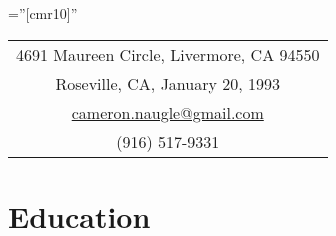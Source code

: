 \documentclass[10pt]{article} %
\newcommand{\secspace}{.25em}
\begin{document}
\thispagestyle{empty} %

\font\fb=''[cmr10]'' %
\setlength{\linewidth}{6.5in}
\setlength{\hsize}{6.5in}

\par{\par} %


\begin{center}
	\begin{tabular} {c}
		
		4691 Maureen Circle, Livermore, CA 94550 \\
		Roseville, CA, January 20, 1993 \\
		\href{mailto:cameron.naugle@gmail.com}{cameron.naugle@gmail.com}\\
		(916) 517-9331\\[\secspace]
	\end{tabular}
\end{center}


\section{Education}
\end{document}
